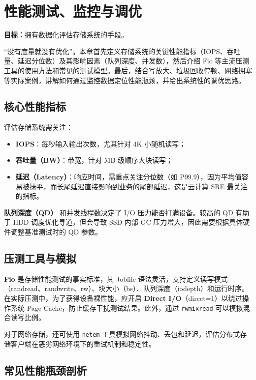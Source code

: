 \documentclass[12pt,UTF8]{ctexbook}
\begin{document}
	\chapter{性能测试、监控与调优}
	\textbf{目标：}拥有数据化评估存储系统的手段。
	
	“没有度量就没有优化”。本章首先定义存储系统的关键性能指标（IOPS、吞吐量、延迟分位数）及其影响因素（队列深度、并发数），然后介绍 Fio 等主流压测工具的使用方法和常见的测试模型。最后，结合写放大、垃圾回收停顿、网络拥塞等实际案例，讲解如何通过监控数据定位性能瓶颈，并给出系统性的调优思路。
	
	\section{核心性能指标}
	
	评估存储系统需关注：
	\begin{itemize}
		\item \textbf{IOPS}：每秒输入输出次数，尤其针对 4K 小随机读写；
		\item \textbf{吞吐量（BW）}：带宽，针对 MB 级顺序大块读写；
		\item \textbf{延迟（Latency）}：响应时间，需重点关注分位数（如 P99.9），因为平均值容易被抹平，而长尾延迟直接影响到业务的尾部延迟，这是云计算 SRE 最关注的指标。
	\end{itemize}
	\textbf{队列深度（QD）} 和并发线程数决定了 I/O 压力能否打满设备。较高的 QD 有助于 HDD 调度优化寻道，但会导致 SSD 内部 GC 压力增大，因此需要根据具体硬件调整基准测试时的 QD 参数。
	
	\section{压测工具与模拟}
	
	\textbf{Fio} 是存储性能测试的事实标准，其 Jobfile 语法灵活，支持定义读写模式（randread、randwrite、rw）、块大小（bs）、队列深度（iodepth）和运行时序。在实际压测中，为了获得设备裸性能，应开启 \textbf{Direct I/O}（direct=1）以绕过操作系统 Page Cache，防止缓存干扰测试结果。此外，通过 \texttt{rwmixread} 可以模拟混合读写比例。
	
	对于网络存储，还可使用 \texttt{netem} 工具模拟网络抖动、丢包和延迟，评估分布式存储客户端在恶劣网络环境下的重试机制和稳定性。
	
	\section{常见性能瓶颈剖析}
	
\end{document}
